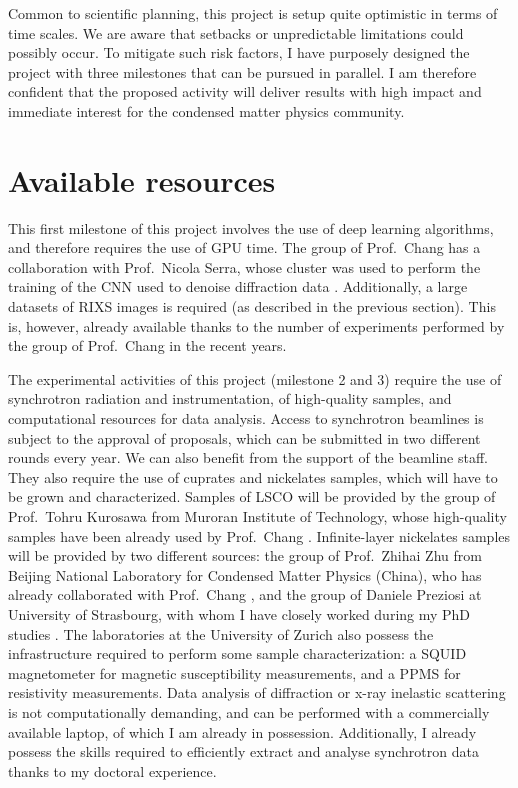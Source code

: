 \documentclass[a4paper, 12pt]{article}
\begin{document}
Common to scientific planning, this project is setup quite optimistic in terms of time scales. We are aware that setbacks or unpredictable limitations could possibly occur. To mitigate such risk factors, I have purposely designed the project with three milestones that can be pursued in parallel. I am therefore confident that the proposed activity will deliver results with high impact and immediate interest for the condensed matter physics community.

\section{Available resources}

This first milestone of this project involves the use of deep learning algorithms, and therefore requires the use of GPU time. The group of Prof.~Chang has a collaboration with Prof.~Nicola Serra, whose cluster was used to perform the training of the CNN used to denoise diffraction data \cite{oppliger2022weak}. Additionally, a large datasets of RIXS images is required (as described in the previous section). This is, however, already available thanks to the number of experiments performed by the group of Prof.~Chang in the recent years. 

The experimental activities of this project (milestone 2 and 3) require the use of synchrotron radiation and instrumentation, of high-quality samples, and computational resources for data analysis. 
Access to synchrotron beamlines is subject to the approval of proposals, which can be submitted in two different rounds every year. We can also benefit from the support of the beamline staff. They also require the use of cuprates and nickelates samples, which will have to be grown and characterized. Samples of LSCO will be provided by the group of Prof.~Tohru Kurosawa from Muroran Institute of Technology, whose high-quality samples have been already used by Prof.~Chang \cite{wang2021charge, wang2022uniaxial}. 
Infinite-layer nickelates samples will be provided by two different sources: the group of Prof.~Zhihai Zhu from Beijing National Laboratory for Condensed Matter Physics (China), who has already collaborated with Prof.~Chang \cite{gaoMagneticExcitationsStrained2022}, and the group of Daniele Preziosi at University of Strasbourg, with whom I have closely worked during my PhD studies \cite{krieger2022charge}.
The laboratories at the University of Zurich also possess the infrastructure required to perform some sample characterization: a SQUID magnetometer for magnetic susceptibility measurements, and a PPMS for resistivity measurements.
Data analysis of diffraction or x-ray inelastic scattering is not computationally demanding, and can be performed with a commercially available laptop, of which I am already in possession. Additionally, I already possess the skills required to efficiently extract and analyse synchrotron data thanks to my doctoral experience.
\end{document}
